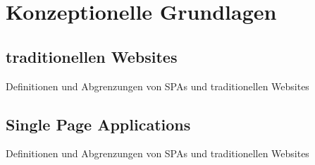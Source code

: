 \section{Konzeptionelle Grundlagen}
\subsection{traditionellen Websites}
Definitionen und Abgrenzungen von SPAs und traditionellen Websites
\subsection{Single Page Applications}
Definitionen und Abgrenzungen von SPAs und traditionellen Websites
